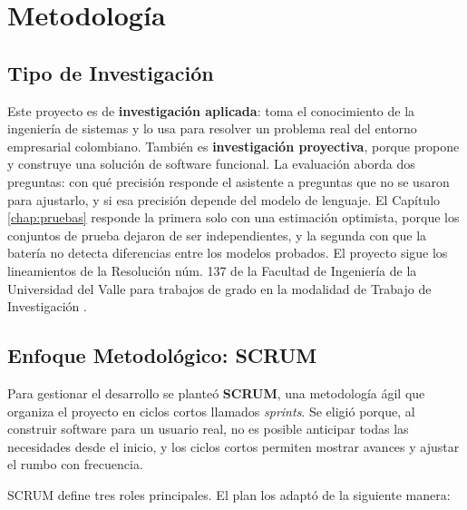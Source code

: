 

\section{Metodología}

\subsection{Tipo de Investigación}

Este proyecto es de \textbf{investigación aplicada}: toma el conocimiento de la ingeniería de sistemas y lo usa para resolver un problema real del entorno empresarial colombiano. También es \textbf{investigación proyectiva}, porque propone y construye una solución de software funcional. La evaluación aborda dos preguntas: con qué precisión responde el asistente a preguntas que no se usaron para ajustarlo, y si esa precisión depende del modelo de lenguaje. El Capítulo \ref{chap:pruebas} responde la primera solo con una estimación optimista, porque los conjuntos de prueba dejaron de ser independientes, y la segunda con que la batería no detecta diferencias entre los modelos probados. El proyecto sigue los lineamientos de la Resolución núm. 137 de la Facultad de Ingeniería de la Universidad del Valle para trabajos de grado en la modalidad de Trabajo de Investigación \cite{univalle_resolucion137}.

\subsection{Enfoque Metodológico: SCRUM}

Para gestionar el desarrollo se planteó \textbf{SCRUM}, una metodología ágil que organiza el proyecto en ciclos cortos llamados \textit{sprints}. Se eligió porque, al construir software para un usuario real, no es posible anticipar todas las necesidades desde el inicio, y los ciclos cortos permiten mostrar avances y ajustar el rumbo con frecuencia.

SCRUM define tres roles principales. El plan los adaptó de la siguiente manera:

